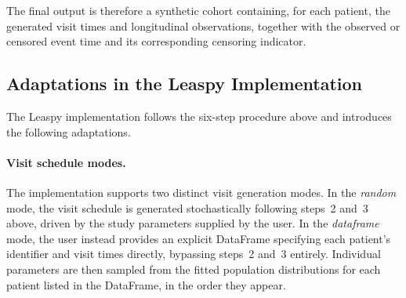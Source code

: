 \documentclass{rapportCS}
\begin{document}
The final output is therefore a synthetic cohort containing, for each patient, the generated visit times and longitudinal observations, together with the observed or censored event time and its corresponding censoring indicator. 


\subsection{Adaptations in the Leaspy Implementation}

The Leaspy implementation follows the six-step procedure above and introduces the following adaptations.

\paragraph{Visit schedule modes.}
The implementation supports two distinct visit generation modes. In the \textit{random} mode, the visit schedule is generated stochastically following steps~2 and~3 above, driven by the study parameters supplied by the user. In the \textit{dataframe} mode, the user instead provides an explicit DataFrame specifying each patient's identifier and visit times directly, bypassing steps~2 and~3 entirely. Individual parameters are then sampled from the fitted population distributions for each patient listed in the DataFrame, in the order they appear.
\end{document}
